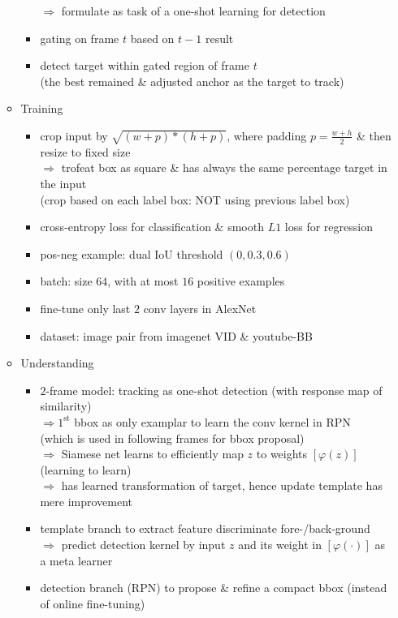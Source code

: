 \begin{itemize}
\begin{itemize}
\begin{itemize}
		$\Rightarrow$ formulate as task of a one-shot learning for detection
		\item gating on frame $t$ based on $t-1$ result
		\item detect target within gated region of frame $t$ \\
		(the best remained \& adjusted anchor as the target to track)
		\end{itemize}
	\item Training
		\begin{itemize}
		\item crop input by $\sqrt{(w+p)*(h+p)}$, where padding $p=\frac{w+h}2$ \& then resize to fixed size \\
		$\Rightarrow$ trofeat box as square \& has always the same percentage  target in the input \\
		(crop based on each label box: NOT using previous label box)
		\item cross-entropy loss for classification \& smooth $L1$ loss for regression
		\item pos-neg example: dual IoU threshold $(0,0.3,0.6)$
		\item batch: size $64$, with at most $16$ positive examples
		\item fine-tune only last $2$ conv layers in AlexNet
		\item dataset: image pair from imagenet VID \& youtube-BB
		\end{itemize}
	\item Understanding
		\begin{itemize}
		\item $2$-frame model: tracking as one-shot detection (with response map of similarity) \\
		$\Rightarrow 1^\text{st}$ bbox as only examplar to learn the conv kernel in RPN \\
		(which is used in following frames for bbox proposal) \\
		$\Rightarrow$ Siamese net learns to efficiently map $z$ to weights $[\varphi (z)]$ (learning to learn) \\
		$\Rightarrow$ has learned transformation of target, hence update template has mere improvement
		\item template branch to extract feature discriminate fore-/back-ground \\
		$\Rightarrow$ predict detection kernel by input $z$ and its weight in $[\varphi(\cdot)]$ as a meta learner
		\item detection branch (RPN) to propose \& refine a compact bbox (instead of online fine-tuning) \\ 

\end{itemize}
\end{itemize}
\end{itemize}
